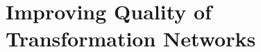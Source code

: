 \part{Improving Quality of Transformation Networks
}
\label{part:quality}




\begin{integrationcontribution}
    
\end{integrationcontribution}


